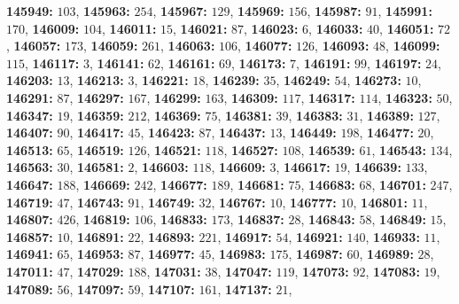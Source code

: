 \textsf{\bfseries 145949:} $103$, \textsf{\bfseries 145963:} $254$, \textsf{\bfseries 145967:} $129$, \textsf{\bfseries 145969:} $156$, \textsf{\bfseries 145987:} $91$, \textsf{\bfseries 145991:} $170$, \textsf{\bfseries 146009:} $104$, \textsf{\bfseries 146011:} $15$, \textsf{\bfseries 146021:} $87$, \textsf{\bfseries 146023:} $6$, \textsf{\bfseries 146033:} $40$, \textsf{\bfseries 146051:} $72$, \textsf{\bfseries 146057:} $173$, \textsf{\bfseries 146059:} $261$, \textsf{\bfseries 146063:} $106$, \textsf{\bfseries 146077:} $126$, \textsf{\bfseries 146093:} $48$, \textsf{\bfseries 146099:} $115$, \textsf{\bfseries 146117:} $3$, \textsf{\bfseries 146141:} $62$, \textsf{\bfseries 146161:} $69$, \textsf{\bfseries 146173:} $7$, \textsf{\bfseries 146191:} $99$, \textsf{\bfseries 146197:} $24$, \textsf{\bfseries 146203:} $13$, \textsf{\bfseries 146213:} $3$, \textsf{\bfseries 146221:} $18$, \textsf{\bfseries 146239:} $35$, \textsf{\bfseries 146249:} $54$, \textsf{\bfseries 146273:} $10$, \textsf{\bfseries 146291:} $87$, \textsf{\bfseries 146297:} $167$, \textsf{\bfseries 146299:} $163$, \textsf{\bfseries 146309:} $117$, \textsf{\bfseries 146317:} $114$, \textsf{\bfseries 146323:} $50$, \textsf{\bfseries 146347:} $19$, \textsf{\bfseries 146359:} $212$, \textsf{\bfseries 146369:} $75$, \textsf{\bfseries 146381:} $39$, \textsf{\bfseries 146383:} $31$, \textsf{\bfseries 146389:} $127$, \textsf{\bfseries 146407:} $90$, \textsf{\bfseries 146417:} $45$, \textsf{\bfseries 146423:} $87$, \textsf{\bfseries 146437:} $13$, \textsf{\bfseries 146449:} $198$, \textsf{\bfseries 146477:} $20$, \textsf{\bfseries 146513:} $65$, \textsf{\bfseries 146519:} $126$, \textsf{\bfseries 146521:} $118$, \textsf{\bfseries 146527:} $108$, \textsf{\bfseries 146539:} $61$, \textsf{\bfseries 146543:} $134$, \textsf{\bfseries 146563:} $30$, \textsf{\bfseries 146581:} $2$, \textsf{\bfseries 146603:} $118$, \textsf{\bfseries 146609:} $3$, \textsf{\bfseries 146617:} $19$, \textsf{\bfseries 146639:} $133$, \textsf{\bfseries 146647:} $188$, \textsf{\bfseries 146669:} $242$, \textsf{\bfseries 146677:} $189$, \textsf{\bfseries 146681:} $75$, \textsf{\bfseries 146683:} $68$, \textsf{\bfseries 146701:} $247$, \textsf{\bfseries 146719:} $47$, \textsf{\bfseries 146743:} $91$, \textsf{\bfseries 146749:} $32$, \textsf{\bfseries 146767:} $10$, \textsf{\bfseries 146777:} $10$, \textsf{\bfseries 146801:} $11$, \textsf{\bfseries 146807:} $426$, \textsf{\bfseries 146819:} $106$, \textsf{\bfseries 146833:} $173$, \textsf{\bfseries 146837:} $28$, \textsf{\bfseries 146843:} $58$, \textsf{\bfseries 146849:} $15$, \textsf{\bfseries 146857:} $10$, \textsf{\bfseries 146891:} $22$, \textsf{\bfseries 146893:} $221$, \textsf{\bfseries 146917:} $54$, \textsf{\bfseries 146921:} $140$, \textsf{\bfseries 146933:} $11$, \textsf{\bfseries 146941:} $65$, \textsf{\bfseries 146953:} $87$, \textsf{\bfseries 146977:} $45$, \textsf{\bfseries 146983:} $175$, \textsf{\bfseries 146987:} $60$, \textsf{\bfseries 146989:} $28$, \textsf{\bfseries 147011:} $47$, \textsf{\bfseries 147029:} $188$, \textsf{\bfseries 147031:} $38$, \textsf{\bfseries 147047:} $119$, \textsf{\bfseries 147073:} $92$, \textsf{\bfseries 147083:} $19$, \textsf{\bfseries 147089:} $56$, \textsf{\bfseries 147097:} $59$, \textsf{\bfseries 147107:} $161$, \textsf{\bfseries 147137:} $21$, 
